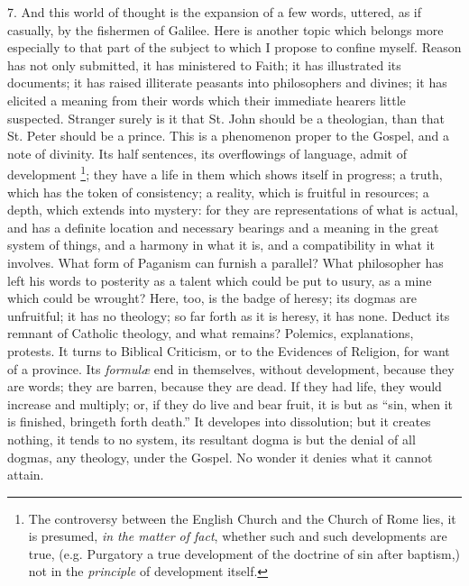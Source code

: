 7. And this world of thought is the expansion of a few words,
uttered, as if casually, by the fishermen of Galilee. Here is another
topic which belongs more especially to that part of the subject to
which I propose to confine myself. Reason has not only submitted, it
has ministered to Faith; it has illustrated its documents; it has
raised illiterate peasants into philosophers and divines; it has
elicited a meaning from their words which their immediate hearers
little suspected. Stranger surely is it that St. John should be a
theologian, than that St. Peter should be a prince. This is a
phenomenon proper to the Gospel, and a note of divinity. Its half
sentences, its overflowings of language, admit of development \footnote{The controversy between the English Church and the Church of
Rome lies, it is presumed, \emph{in the matter of fact}, whether such
and such developments are true, (e.g. Purgatory a true development of
the doctrine of sin after baptism,) not in the \emph{principle} of
development itself.}; they have a life in them which shows itself in progress; a truth,
which has the token of consistency; a reality, which is fruitful in
resources; a depth, which extends into mystery: for they are
representations of what is actual, and has a definite location and
necessary bearings and a meaning in the great system of things, and a
harmony in what it is, and a compatibility in what it involves. What
form of Paganism can furnish a parallel? What philosopher has left his
words to posterity as a talent which could be put to usury, as a mine
which could be wrought? Here, too, is the badge of heresy; its dogmas
are unfruitful; it has no theology; so far forth as it is heresy, it
has none. Deduct its remnant of Catholic theology, and what remains?
Polemics, explanations, protests. It turns to Biblical Criticism, or
to the Evidences of Religion, for want of a province. Its \emph{formulæ}
end in themselves, without development, because they are words; they
are barren, because they are dead. If they had life, they would
increase and multiply; or, if they do live and bear fruit, it is but
as ``sin, when it is finished, bringeth forth death.'' It
developes into dissolution; but it creates nothing, it tends to no
system, its resultant dogma is but the denial of all dogmas, any
theology, under the Gospel. No wonder it denies what it cannot attain.

